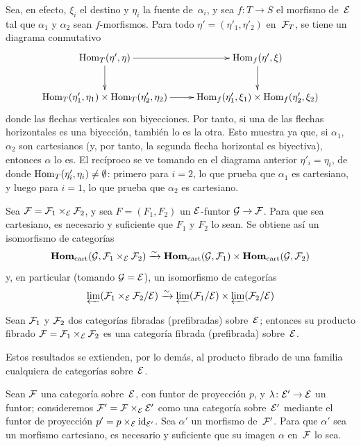Sea, en efecto, $\xi_i$ el destino y $\eta_i$ la fuente de~$\alpha_i$, y
sea $f\colon T\to S$ el morfismo de~$\cal{E}$ tal que $\alpha_1$ y
$\alpha_2$ sean $f$-morfismos. Para todo
$\eta'=(\eta'_1,\eta'_2)$ en~$\cal{F}_T$, se tiene un diagrama conmutativo
$$
\xymatrix{ \Hom_T(\eta',\eta) \ar[r] \ar[d] & \Hom_f(\eta',\xi) \ar[d]
\\ \Hom_T(\eta'_1,\eta_1)\times\Hom_T(\eta'_2,\eta_2) \ar[r] &
\Hom_f(\eta'_1,\xi_1)\times \Hom_f(\eta'_2,\xi_2) }
$$
donde las flechas verticales son biyecciones. Por tanto, si una de las
flechas horizontales es una biyección, también lo es la otra. Esto muestra
ya que, si $\alpha_1$, $\alpha_2$ son cartesianos (y, por tanto, la segunda
flecha horizontal es biyectiva), entonces $\alpha$ lo es. El recíproco se
ve tomando en el diagrama anterior $\eta'_i=\eta_i$, de donde
$\Hom_T(\eta'_i,\eta_i)\neq\emptyset$: primero para $i=2$, lo que prueba
que $\alpha_1$ es cartesiano, y luego para $i=1$, lo que prueba que
$\alpha_2$ es cartesiano.

\begin{corollaire}
\label{VI.6.4}
Sea
$\cal{F}=\cal{F}_1\times_{\cal{E}}\cal{F}_2$, y sea $F=(F_1,F_2)$ un
$\cal{E}$-funtor $\cal{G}\to\cal{F}$. Para que
sea cartesiano, es necesario y suficiente que $F_1$ y $F_2$ lo sean. Se
obtiene así un isomorfismo de categorías
$$
\SheafHom_\cart(\cal{G}, \cal{F}_1 \times_{\cal{E}} \cal{F}_2) \isomto
\SheafHom_\cart(\cal{G},\cal{F}_1)
\times\SheafHom_\cart(\cal{G},\cal{F}_2)
$$
y, en particular (tomando $\cal{G}=\cal{E}$), un isomorfismo de categorías
$$
\varprojLim(\cal{F}_1 \times_{\cal{E}}
\cal{F}_2/\cal{E}) \isomto
\varprojLim(\cal{F}_1/\cal{E}) \times
\varprojLim(\cal{F}_2/\cal{E})
$$
\end{corollaire}

\begin{corollaire}
\label{VI.6.5}
Sean $\cal{F}_1$ y $\cal{F}_2$ dos categorías fibradas (\resp prefibradas)
sobre~$\cal{E}$; entonces su producto fibrado
$\cal{F}=\cal{F}_1\times_{\cal{E}}\cal{F}_2$ es una categoría fibrada
(\resp prefibrada) sobre~$\cal{E}$.
\end{corollaire}

Estos resultados se extienden, por lo demás, al producto fibrado de una
familia cualquiera de categorías sobre~$\cal{E}$.

\begin{proposition}
\label{VI.6.6}
Sean $\cal{F}$ una categoría sobre~$\cal{E}$, con funtor de proyección
$p$, y $\lambda\colon\cal{E}'\to\cal{E}$ un funtor; consideremos
$\cal{F}'=\cal{F}\times_{\cal{E}}\cal{E}'$ como una categoría
sobre~$\cal{E}'$ mediante el funtor de proyección
$p'=p\times_{\cal{E}}\id_{\cal{E}'}$. Sea $\alpha'$ un morfismo
de~$\cal{F}'$. Para que $\alpha'$ sea un morfismo cartesiano, es necesario
y suficiente que su imagen $\alpha$ en~$\cal{F}$ lo sea.
\end{proposition}

